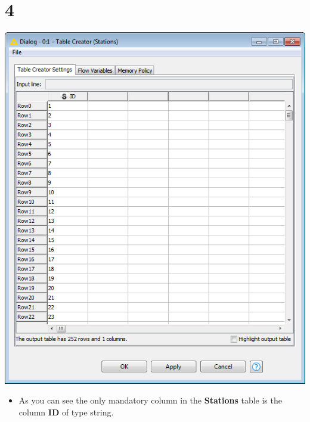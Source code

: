 \documentclass[10pt]{beamer}
\begin{document}
\section{4}
\begin{frame}
	\begin{center}
  		\includegraphics[height=0.6\textheight]{4.png}
	\end{center}
	\begin{itemize}
		\item As you can see the only mandatory column in the \textbf{Stations} table is the column \textbf{ID} of type string.
	\end{itemize}
\end{frame}
\end{document}
